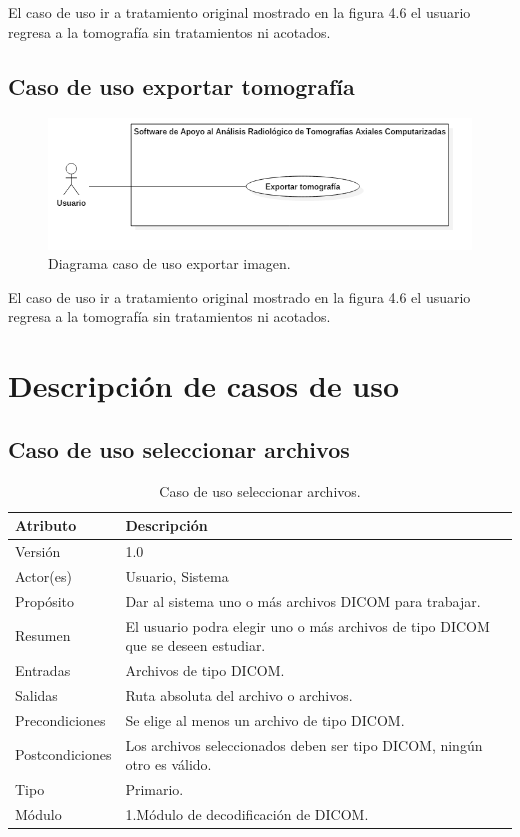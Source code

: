 \documentclass[12pt]{report}
\begin{document}
El caso de uso ir a tratamiento original mostrado en la figura 4.6 el usuario regresa a la tomografía sin tratamientos ni acotados.

\subsection{Caso de uso exportar tomografía}
\begin{figure}[H]
\centering
\includegraphics[width = 9 cm, height =  7 cm]{expor}
\caption{Diagrama caso de uso exportar imagen.}
\end{figure}

El caso de uso ir a tratamiento original mostrado en la figura 4.6 el usuario regresa a la tomografía sin tratamientos ni acotados.

\section{Descripción de casos de uso}

\subsection{Caso de uso seleccionar archivos}
\begin{table}[H]
\begin{center}
\begin{tabular}{p{30mm}p{80mm}}
\hline
Atributo & Descripción\\
\hline \hline 
Versión & 1.0\\
Actor(es) & Usuario, Sistema\\
Propósito & Dar al sistema uno o más archivos DICOM para trabajar.\\
Resumen & El usuario podra elegir uno o más archivos de tipo DICOM que se deseen estudiar.\\
Entradas & Archivos de tipo DICOM.\\
Salidas & Ruta absoluta del archivo o archivos.\\
Precondiciones & Se elige al menos un archivo de tipo DICOM.\\
Postcondiciones & Los archivos seleccionados deben ser tipo DICOM, ningún otro es válido.\\
Tipo & Primario.\\
Módulo & 1.Módulo de decodificación de DICOM.\\
\hline \hline
\end{tabular}
\caption{Caso de uso seleccionar archivos.}
\end{center}
\end{table}
\end{document}
